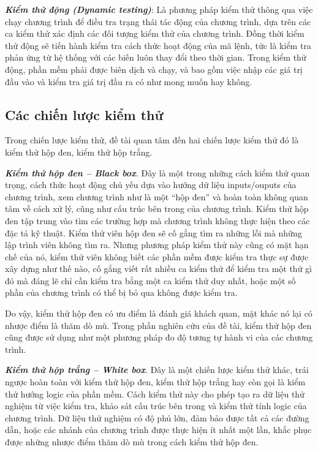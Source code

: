 \textbf{\textit{Kiểm thử động (Dynamic testing)}}: Là phương pháp kiểm thử thông qua việc chạy chương trình để điều tra trạng thái tác động của chương trình, dựa trên các ca kiểm thử xác định các đối tượng kiểm thử của chương trình. Đồng thời kiểm thử động sẽ tiến hành kiểm tra cách thức hoạt động của mã lệnh, tức là kiểm tra phản ứng từ hệ thống với các biến luôn thay đổi theo thời gian. Trong kiểm thử động, phần mềm phải được biên dịch và chạy, và bao gồm việc nhập các giá trị đầu vào và kiểm tra giá trị đầu ra có như mong muốn hay không.	
	
\subsection{Các chiến lược kiểm thử}

Trong chiến lược kiểm thử, đề tài quan tâm đến hai chiến lược kiểm thử đó là kiểm thử hộp đen, kiểm thử hộp trắng.
	
\textbf{\textit{Kiểm thử hộp đen – Black box}}. Đây là một trong những cách kiểm thử quan trọng, cách thức hoạt động chủ yếu dựa vào hướng dữ liệu inputs/ouputs của chương trình, xem chương trình như là một “hộp đen” và hoàn toàn không quan tâm về cách xử lý, cũng như cấu trúc bên trong của chương trình. Kiểm thử hộp đen tập trung vào tìm các trường hợp mà chương trình không thực hiện theo các đặc tả kỹ thuật. Kiểm thử viên hộp đen sẽ cố gắng tìm ra những lỗi mà những lập trình viên không tìm ra. Nhưng phương pháp kiểm thử này cũng có mặt hạn chế của nó, kiểm thử viên không biết các phần mềm được kiểm tra thực sự được xây dựng như thế nào, cố gắng viết rất nhiều ca kiểm thử để kiểm tra một thứ gì đó mà đáng lẽ chỉ cần kiểm tra bằng một ca kiểm thử duy nhất, hoặc một số phần của chương trình có thể bị bỏ qua không được kiểm tra.
		
Do vậy, kiểm thử hộp đen có ưu điểm là đánh giá khách quan, mặt khác nó lại có nhược điểm là thăm dò mù. Trong phần nghiên cứu của đề tài, kiểm thử hộp đen cũng được sử dụng như một phương pháp đo độ tương tự hành vi của các chương trình.
		
\textbf{\textit{Kiểm thử hộp trắng – White box}}. Đây là một chiến lược kiểm thử khác, trái ngược hoàn toàn với kiểm thử hộp đen, kiểm thử hộp trắng hay còn gọi là kiểm thử hướng logic của phần mềm. Cách kiểm thử này cho phép tạo ra dữ liệu thử nghiệm từ việc kiểm tra, khảo sát cấu trúc bên trong và kiểm thử tính logic của chương trình. Dữ liệu thử nghiệm có độ phủ lớn, đảm bảo được tất cả các đường dẫn, hoặc các nhánh của chương trình được thực hiện ít nhất một lần, khắc phục được những nhược điểm thăm dò mù trong cách kiểm thử hộp đen.
		
